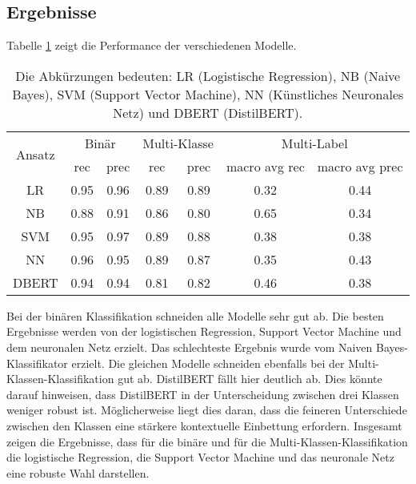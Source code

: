 \subsection{Ergebnisse}
Tabelle \ref{tab:ergebnisse} zeigt die Performance der verschiedenen Modelle.
\begin{table}[ht]
    \centering
    \begin{tabular}{|c|c|c|c|c|c|c|}
        \hline
        \multirow{2}{*}{Ansatz} & \multicolumn{2}{c|}{Binär} & \multicolumn{2}{c|}{Multi-Klasse} & \multicolumn{2}{c|}{Multi-Label}                                         \\
        \cline{2-7}
                                & rec                        & prec                              & rec                              & prec & macro avg rec & macro avg prec \\
        \hline
        LR                      & 0.95                       & 0.96                              & 0.89                             & 0.89 & 0.32          & 0.44           \\
        \hline
        NB                      & 0.88                       & 0.91                              & 0.86                             & 0.80 & 0.65          & 0.34           \\
        \hline
        SVM                     & 0.95                       & 0.97                              & 0.89                             & 0.88 & 0.38          & 0.38           \\
        \hline
        NN                      & 0.96                       & 0.95                              & 0.89                             & 0.87 & 0.35          & 0.43           \\
        \hline
        DBERT                   & 0.94                       & 0.94                              & 0.81                             & 0.82 & 0.46          & 0.38           \\
        \hline
    \end{tabular}
    \caption{Die Abkürzungen bedeuten: LR (Logistische Regression), NB (Naive Bayes), SVM (Support Vector Machine), NN (Künstliches Neuronales Netz) und DBERT (DistilBERT).}
    \label{tab:ergebnisse}
\end{table}

Bei der binären Klassifikation schneiden alle Modelle sehr gut ab. Die besten Ergebnisse werden von der logistischen Regression, Support Vector Machine und dem neuronalen Netz erzielt. Das schlechteste Ergebnis wurde vom Naiven Bayes-Klassifikator erzielt. Die gleichen Modelle schneiden ebenfalls bei der Multi-Klassen-Klassifikation gut ab. DistilBERT fällt hier deutlich ab. Dies könnte darauf hinweisen, dass DistilBERT in der Unterscheidung zwischen drei Klassen weniger robust ist. Möglicherweise liegt dies daran, dass die feineren Unterschiede zwischen den Klassen eine stärkere kontextuelle Einbettung erfordern. Insgesamt zeigen die Ergebnisse, dass für die binäre und für die Multi-Klassen-Klassifikation die logistische Regression, die Support Vector Machine und das neuronale Netz eine robuste Wahl darstellen.

